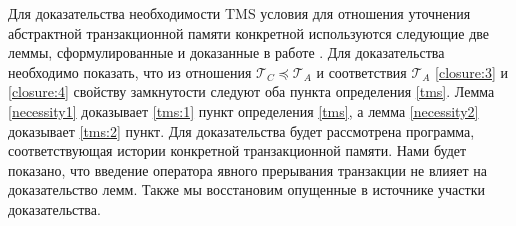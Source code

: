 Для доказательства необходимости TMS условия для отношения уточнения абстрактной транзакционной памяти конкретной используются следующие две леммы, сформулированные и доказанные в работе \cite{tms_article}. Для доказательства необходимо показать, что из отношения $\mathcal{T}_C \preceq \mathcal{T}_A$ и соответствия $\mathcal{T}_A$ \ref{closure:3} и \ref{closure:4} свойству замкнутости следуют оба пункта определения \ref{tms}. Лемма \ref{necessity1} доказывает \ref{tms:1} пункт определения \ref{tms}, а лемма \ref{necessity2} доказывает \ref{tms:2} пункт. Для доказательства будет рассмотрена программа, соответствующая истории конкретной транзакционной памяти. Нами будет показано, что введение оператора явного прерывания транзакции не влияет на доказательство лемм. Также мы восстановим опущенные в источнике участки доказательства.     

